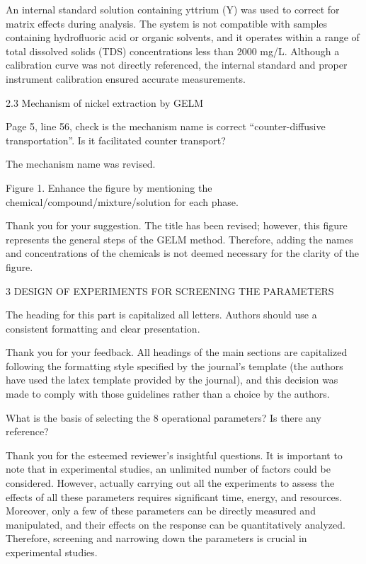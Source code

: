 \documentclass[11pt,answers]{exam}
\begin{document}
\begin{questions}
\begin{solutionorbox}
An internal standard solution containing yttrium (Y) was used to correct for matrix effects during analysis. The system is not compatible with samples containing hydrofluoric acid or organic solvents, and it operates within a range of total dissolved solids (TDS) concentrations less than 2000 mg/L. Although a calibration curve was not directly referenced, the internal standard and proper instrument calibration ensured accurate measurements.
\end{solutionorbox}
2.3 Mechanism of nickel extraction by GELM

\question Page 5, line 56, check is the mechanism name is correct “counter-diffusive transportation”. Is it facilitated counter transport?
\begin{solutionorbox}
The mechanism name was revised.
\end{solutionorbox}


\question Figure 1. Enhance the figure by mentioning the chemical/compound/mixture/solution for each phase.
\begin{solutionorbox}
Thank you for your suggestion. The title has been revised; however, this figure represents the general steps of the GELM method. Therefore, adding the names and concentrations of the chemicals is not deemed necessary for the clarity of the figure.
\end{solutionorbox}

3 DESIGN OF EXPERIMENTS FOR SCREENING THE PARAMETERS

\question The heading for this part is capitalized all letters. Authors should use a consistent formatting and clear presentation.
\begin{solutionorbox}
Thank you for your feedback. All headings of the main sections are capitalized following the formatting style specified by the journal's template (the authors have used the latex template provided by the journal), and this decision was made to comply with those guidelines rather than a choice by the authors.
\end{solutionorbox}

\question What is the basis of selecting the 8 operational parameters? Is there any reference?

\begin{solutionorbox}

Thank you for the esteemed reviewer's insightful questions. It is important to note that in experimental studies, an unlimited number of factors could be considered. However, actually carrying out all the experiments to assess the effects of all these parameters requires significant time, energy, and resources. Moreover, only a few of these parameters can be directly measured and manipulated, and their effects on the response can be quantitatively analyzed. Therefore, screening and narrowing down the parameters is crucial in experimental studies.


\end{solutionorbox}
\end{questions}
\end{document}
